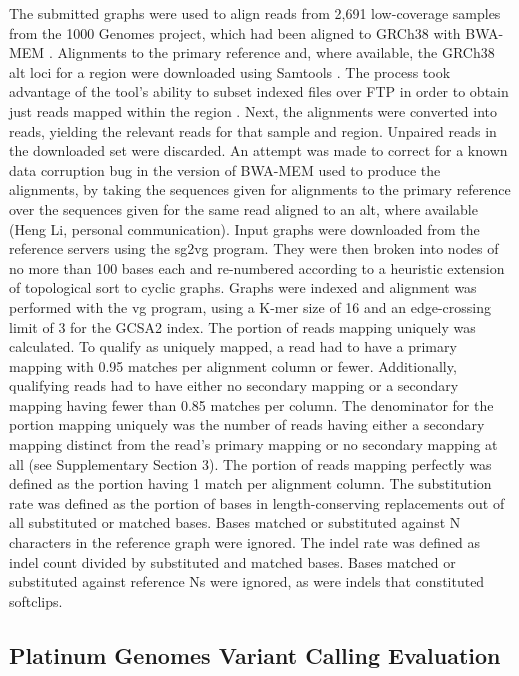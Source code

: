The submitted graphs were used to align reads from 2,691 low-coverage
samples from the 1000 Genomes project, which had been aligned to GRCh38
with BWA-MEM \cite{li2009fast}. Alignments to the primary reference and,
where available, the GRCh38 alt loci for a region were downloaded using
Samtools \cite{Li2009-je}. The process took advantage of the tool's
ability to subset indexed files over FTP in order to obtain just reads
mapped within the region \cite{Li2009-je}. Next, the alignments were
converted into reads, yielding the relevant reads for that sample and
region. Unpaired reads in the downloaded set were discarded. An attempt
was made to correct for a known data corruption bug in the version of
BWA-MEM used to produce the alignments, by taking the sequences given
for alignments to the primary reference over the sequences given for the
same read aligned to an alt, where available (Heng Li, personal
communication). Input graphs were downloaded from the reference servers
using the sg2vg program. They were then broken into nodes of no more
than 100 bases each and re-numbered according to a heuristic extension
of topological sort to cyclic graphs. Graphs were indexed and alignment
was performed with the vg program, using a K-mer size of 16 and an
edge-crossing limit of 3 for the GCSA2 index. The portion of reads
mapping uniquely was calculated. To qualify as uniquely mapped, a read
had to have a primary mapping with 0.95 matches per alignment column or
fewer. Additionally, qualifying reads had to have either no secondary
mapping or a secondary mapping having fewer than 0.85 matches per
column. The denominator for the portion mapping uniquely was the number
of reads having either a secondary mapping distinct from the read's
primary mapping or no secondary mapping at all (see Supplementary
Section 3). The portion of reads mapping perfectly was defined as the
portion having 1 match per alignment column. The substitution rate was
defined as the portion of bases in length-conserving replacements out of
all substituted or matched bases. Bases matched or substituted against N
characters in the reference graph were ignored. The indel rate was
defined as indel count divided by substituted and matched bases. Bases
matched or substituted against reference Ns were ignored, as were indels
that constituted softclips.

\subsection{Platinum Genomes Variant Calling Evaluation}

